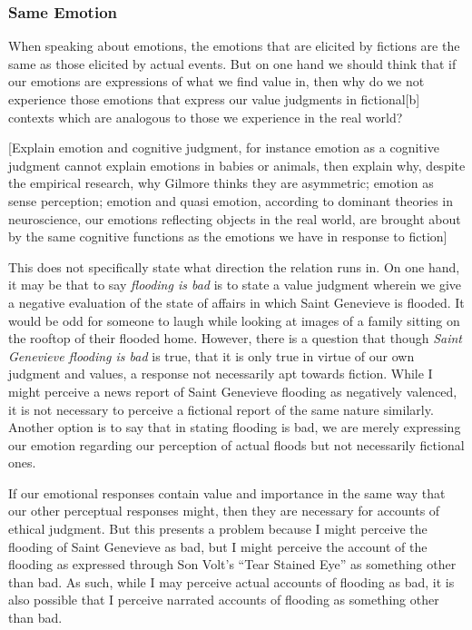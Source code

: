 \documentclass[phdthesis,12pt,final,a4paper]{wuthesis}
\theoremstyle{definition}
\theoremstyle{definition}
\theoremstyle{definition}
\theoremstyle{definition}
\theoremstyle{remark}
\begin{document}
\subsubsection*{Same Emotion}\label{same-emotion}

When speaking about emotions, the emotions that are elicited by fictions are the same as those elicited by actual events. But on one hand we should think that if our emotions are expressions of what we find value in, then why do we not experience those emotions that express our value judgments in fictional{[}b{]} contexts which are analogous to those we experience in the real world?

{[}Explain emotion and cognitive judgment, for instance emotion as a cognitive judgment cannot explain emotions in babies or animals, then explain why, despite the empirical research, why Gilmore thinks they are asymmetric; emotion as sense perception; emotion and quasi emotion, according to dominant theories in neuroscience, our emotions reflecting objects in the real world, are brought about by the same cognitive functions as the emotions we have in response to fiction{]}

This does not specifically state what direction the relation runs in. On one hand, it may be that to say \emph{flooding is bad} is to state a value judgment wherein we give a negative evaluation of the state of affairs in which Saint Genevieve is flooded. It would be odd for someone to laugh while looking at images of a family sitting on the rooftop of their flooded home. However, there is a question that though \emph{Saint Genevieve flooding is bad} is true, that it is only true in virtue of our own judgment and values, a response not necessarily apt towards fiction. While I might perceive a news report of Saint Genevieve flooding as negatively valenced, it is not necessary to perceive a fictional report of the same nature similarly. Another option is to say that in stating flooding is bad, we are merely expressing our emotion regarding our perception of actual floods but not necessarily fictional ones.

If our emotional responses contain value and importance in the same way that our other perceptual responses might, then they are necessary for accounts of ethical judgment. But this presents a problem because I might perceive the flooding of Saint Genevieve as bad, but I might perceive the account of the flooding as expressed through Son Volt's ``Tear Stained Eye'' as something other than bad. As such, while I may perceive actual accounts of flooding as bad, it is also possible that I perceive narrated accounts of flooding as something other than bad.
\end{document}

